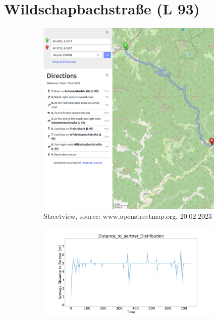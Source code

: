 \section{Wildschapbachstraße (L 93)}
\begin{figure}[H]
	\centering
	\begin{subfigure}[b]{0.45\textwidth}
		\centering
		\includegraphics[width=1.0\linewidth]{images/Wildschapbachstrase/Wildschapbachstrase.png}
		\caption{Streetview, source: www.openstreetmap.org, 20.02.2023}
	\end{subfigure}
	\hfill
	\begin{subfigure}[b]{0.45\textwidth}
		\centering
		\includegraphics[width=1.0\textwidth]{images/Wildschapbachstrase/Wildschapbachstrase_AVG_Distance_to_partner_distribution_free.png}

\end{subfigure}
\end{figure}
